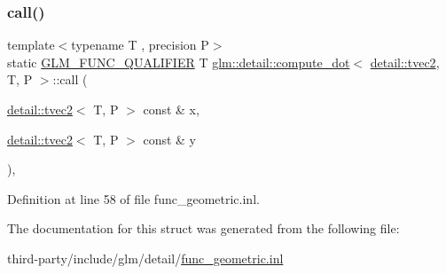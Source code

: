 \subsubsection{\texorpdfstring{call()}{call()}}
{\footnotesize\ttfamily template$<$typename T , precision P$>$ \\
static \hyperlink{setup_8hpp_a33fdea6f91c5f834105f7415e2a64407}{G\+L\+M\+\_\+\+F\+U\+N\+C\+\_\+\+Q\+U\+A\+L\+I\+F\+I\+ER} T \hyperlink{structglm_1_1detail_1_1compute__dot}{glm\+::detail\+::compute\+\_\+dot}$<$ \hyperlink{structglm_1_1detail_1_1tvec2}{detail\+::tvec2}, T, P $>$\+::call (\begin{DoxyParamCaption}\item[{\hyperlink{structglm_1_1detail_1_1tvec2}{detail\+::tvec2}$<$ T, P $>$ const \&}]{x,  }\item[{\hyperlink{structglm_1_1detail_1_1tvec2}{detail\+::tvec2}$<$ T, P $>$ const \&}]{y }\end{DoxyParamCaption})\hspace{0.3cm}{\ttfamily [inline]}, {\ttfamily [static]}}



Definition at line 58 of file func\+\_\+geometric.\+inl.



The documentation for this struct was generated from the following file\+:\begin{DoxyCompactItemize}
\item 
third-\/party/include/glm/detail/\hyperlink{func__geometric_8inl}{func\+\_\+geometric.\+inl}\end{DoxyCompactItemize}
